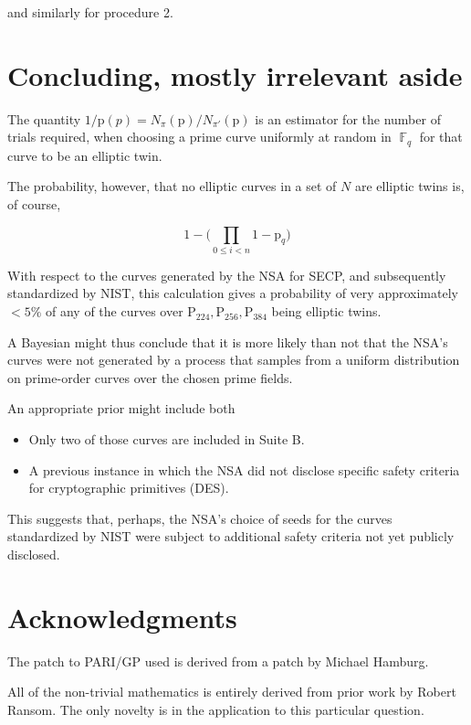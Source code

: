 \documentclass[11pt,fleqn]{article}
\newcommand{\p}{\ensuremath{\mathup{p}} }
\newcommand{\Pa}{\ensuremath{\mathup{P}_{224}} }
\newcommand{\Pb}{\ensuremath{\mathup{P}_{256}} }
\newcommand{\Pc}{\ensuremath{\mathup{P}_{384}} }
\begin{document}
and similarly for procedure 2.

\section{Concluding, mostly irrelevant aside}

The quantity $1 / \p(p) = N_{\pi}(\p) / N_{\pi'}(\p)$ is an estimator for
the number of trials required, when choosing a prime curve uniformly at
random in $\BbbF_q$ for that curve to be an elliptic twin.

The probability, however, that no elliptic curves in a set of $N$
are elliptic twins is, of course,

\begin{equation}
1 - \lparen \prod_{0 \leq i < n} 1 - \p_q \rparen
\end{equation}

With respect to the curves generated by the NSA for SECP, and subsequently
standardized by NIST, this calculation gives a probability of very approximately
$< 5\%$ of any of the curves over $\Pa, \Pb, \Pc$ being elliptic twins.

A Bayesian might thus conclude that it is more likely than not that
the NSA's curves were not generated by a process that samples from
a uniform distribution on prime-order curves over the chosen prime fields.

An appropriate prior might include both

\begin{itemize}

\item Only two of those curves are included in Suite B.

\item A previous instance in which the NSA did not disclose specific
safety criteria for cryptographic primitives (DES).

\end{itemize}

This suggests that, perhaps, the NSA's choice of seeds for the curves
standardized by NIST were subject to additional safety criteria not yet
publicly disclosed.

\section{Acknowledgments}

The patch to PARI/GP used is derived from a patch by Michael Hamburg.

All of the non-trivial mathematics is entirely derived from prior work by
Robert Ransom. The only novelty is in the application to this particular
question.
\end{document}
